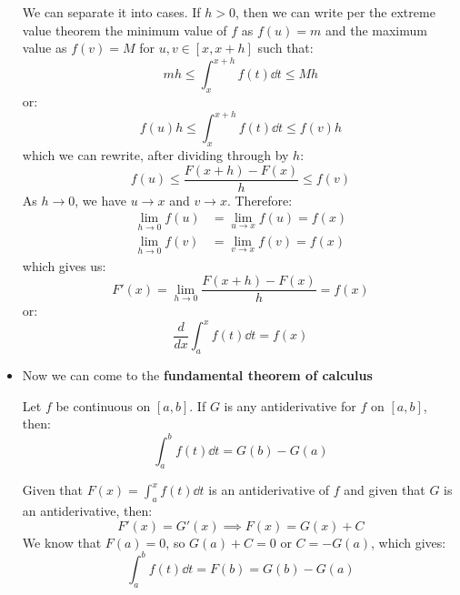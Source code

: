\begin{itemize}
\begin{prooof}
\begin{equation}
            \label{eq:}
        \end{equation}
        We can separate it into cases. If $h>0$, then we can write per the extreme value theorem the minimum value of $f$ as $f(u)=m$ and the maximum value as $f(v)=M$ for $u,v\in[x,x+h]$ such that:
        \begin{equation}
            mh \le \int_x^{x+h} f(t)\dd{t} \le Mh
            \label{eq:}
        \end{equation}
        or:
        \begin{equation}
            f(u)h \le \int_x^{x+h}f(t)\dd{t} \le f(v)h
            \label{eq:}
        \end{equation}
        which we can rewrite, after dividing through by $h$:
        \begin{equation}
            f(u) \le \frac{F(x+h)-F(x)}{h} \le f(v)
            \label{eq:}
        \end{equation}
        As $h\to 0$, we have $u\to x$ and $v\to x$. Therefore:
        \begin{align}
            \lim_{h\to 0} f(u) &= \lim_{u\to x}f(u) = f(x) \\ 
            \lim_{h\to 0} f(v) &= \lim_{v\to x}f(v) = f(x)
            \label{eq:}
        \end{align}
        which gives us:
        \begin{equation}
            F'(x)=\lim_{h\to 0} \frac{F(x+h)-F(x)}{h} = f(x)
            \label{eq:}
        \end{equation}
        or:
        \begin{equation}
            \frac{d}{dx}\int_a^x f(t) \dd{t} = f(x)
            \label{eq:}
        \end{equation}
    \end{prooof}
    \item Now we can come to the \textbf{fundamental theorem of calculus}
    \begin{theorem}
        Let $f$ be continuous on $[a,b]$. If $G$ is any antiderivative for $f$ on $[a,b]$, then:
        \begin{equation}
            \int_a^b f(t) \dd{t} = G(b)-G(a)
            \label{eq:}
        \end{equation}
    \end{theorem}
    \begin{prooof}
        Given that $F(x)=\int_a^x f(t) \dd{t}$ is an antiderivative of $f$ and given that $G$ is an antiderivative, then:
        \begin{equation}
            F'(x)=G'(x) \implies F(x) = G(x)+C
            \label{eq:}
        \end{equation}
        We know that $F(a)=0$, so $G(a)+C=0$ or $C=-G(a)$, which gives:
        \begin{equation}
            \int_a^b f(t) \dd{t} = F(b) = G(b) - G(a)
            \label{eq:}
        \end{equation}
    \end{prooof}
\end{itemize}